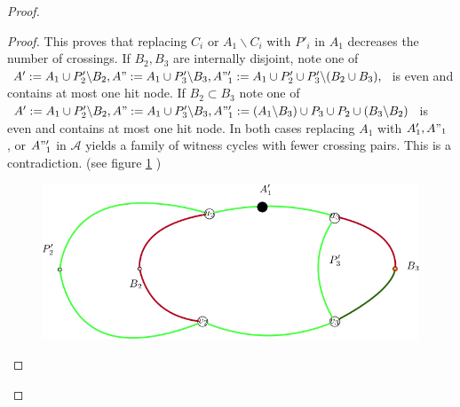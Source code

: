 \documentclass[letterpaper,11pt]{article}
\newcommand{\0}{\mathbb{0}}
\newcommand{\1}{\mathbb{1}}
\begin{document}
\begin{proof}
\begin{proof}
This proves that replacing $C_i$ or $A_1 \backslash C_i$ with $P'_i$ in $A_1$ decreases the number of crossings.
If $B_2,B_3$ are internally disjoint, note one of $ A' :=  A_1 \cup P'_2 \backslash B_2 , A" :=  A_1 \cup P'_3 \backslash B_3 , A"'_1:=  A_1 \cup P'_2 \cup P'_3 \backslash (B_2 \cup B_3) ,   $ is even and  contains at most one hit node.
If $B_2 \subset B_3 $ note one of $ A' :=  A_1 \cup P'_2 \backslash B_2 , A" :=  A_1 \cup P'_3 \backslash B_3 , A"'_1:= (A_1 \backslash B_3) \cup P_3 \cup P_2 \cup (B_3 \backslash B_2)$ is even and contains at most one hit node. In both cases replacing $A_1$ with $A'_1 , A"_1$ , or $A"'_1$  in $\mathcal{A}$ yields a family of witness cycles with fewer crossing pairs. This is a contradiction. (see figure \ref{disjointPicont} )  
\begin{figure}
    \centering
    \includegraphics[scale=0.3]{DisjointP_iCont}
    \caption{}
    \label{disjointPicont}
\end{figure}
\end{proof}


\end{proof}
\end{document}
